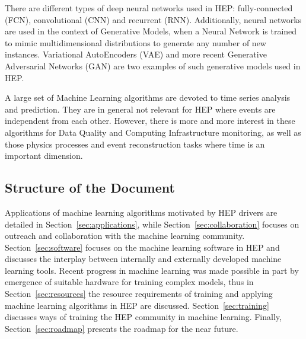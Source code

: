 There are different types of deep neural networks used in HEP: fully-connected (FCN), convolutional (CNN) and recurrent (RNN). Additionally, neural networks are used in the context of Generative Models, when a Neural Network is trained to mimic multidimensional distributions to generate any number of new instances. Variational AutoEncoders (VAE) and more recent Generative Adversarial Networks (GAN) are two examples of such generative models used in HEP.

A large set of Machine Learning algorithms are devoted to time series analysis and prediction. They are in general not relevant for HEP where events are independent from each other. However, there is more and more interest in these algorithms for Data Quality and Computing Infrastructure monitoring, as well as those physics processes and event reconstruction tasks where time is an important dimension.


\subsection{Structure of the Document}


Applications of machine learning algorithms motivated by HEP drivers are detailed in Section~\ref{sec:applications}, while Section~\ref{sec:collaboration} focuses on outreach and collaboration with the machine learning community. Section~\ref{sec:software} focuses on the machine learning software in HEP and discusses the interplay between internally and externally developed machine learning tools. Recent progress in machine learning was made possible in part by emergence of suitable hardware for training complex models, thus in Section~\ref{sec:resources} the resource requirements of training and applying machine learning algorithms in HEP are discussed. Section~\ref{sec:training} discusses ways of training the HEP community in machine learning.  Finally, Section~\ref{sec:roadmap} presents the roadmap for the near future.


